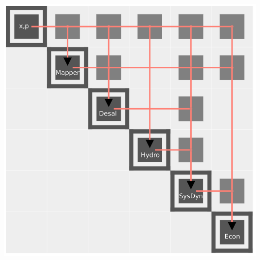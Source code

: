 \documentclass[twocolumn,10pt]{asme2e}
\begin{document}
\begin{center}
    \includegraphics[width=\linewidth]{../figs/n2.pdf}
    \label{fig:n2}
\end{center} 
\end{document}

